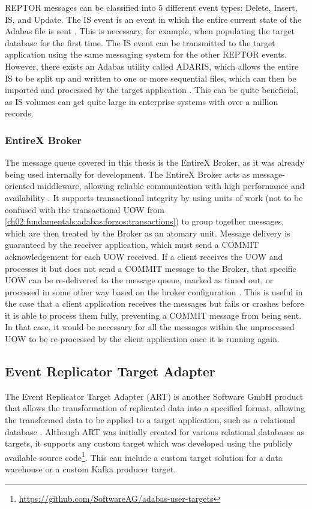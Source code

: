 \ac{REPTOR} messages can be classified into 5 different event types: Delete, Insert, \ac{IS}, and Update. The \ac{IS} event is an event in which the entire current state of the Adabas file is sent \cite{reptorprogrammersref}. This is necessary, for example, when populating the target database for the first time. The \ac{IS} event can be transmitted to the target application using the same messaging system for the other \ac{REPTOR} events. However, there exists an Adabas utility called ADARIS, which allows the entire \ac{IS} to be split up and written to one or more sequential files, which can then be imported and processed by the target application \cite{reptorconcepts}. This can be quite beneficial, as \ac{IS} volumes can get quite large in enterprise systems with over a million records.

\subsubsection{EntireX Broker}
\label{ch02:fundamentals:adabas:entirex}
The message queue covered in this thesis is the EntireX Broker, as it was already being used internally for development. The EntireX Broker acts as message-oriented middleware, allowing reliable communication with high performance and availability \cite{entirexbrokerintro}. It supports transactional integrity by using units of work (not to be confused with the transactional \ac{UOW} from \ref{ch02:fundamentals:adabas:forzos:transactions}) to group together messages, which are then treated by the Broker as an atomary unit. Message delivery is guaranteed by the receiver application, which must send a COMMIT acknowledgement for each \ac{UOW} received. If a client receives the \ac{UOW} and processes it but does not send a COMMIT message to the Broker, that specific \ac{UOW} can be re-delivered to the message queue, marked as timed out, or processed in some other way based on the broker configuration \cite{entirexbrokeradmin}. This is useful in the case that a client application receives the messages but fails or crashes before it is able to process them fully, preventing a COMMIT message from being sent. In that case, it would be necessary for all the messages within the unprocessed \ac{UOW} to be re-processed by the client application once it is running again.

\subsection{Event Replicator Target Adapter}
\label{ch02:fundamentals:adabas:art}
The Event Replicator Target Adapter (\ac{ART}) is another Software GmbH product that allows the transformation of replicated data into a specified format, allowing the transformed data to be applied to a target application, such as a relational database \cite{artconcepts}. Although \ac{ART} was initially created for various relational databases as targets, it supports any custom target which was developed using the publicly available source code\footnote{\url{https://github.com/SoftwareAG/adabas-user-targets}}. This can include a custom target solution for a data warehouse or a custom Kafka producer target.

